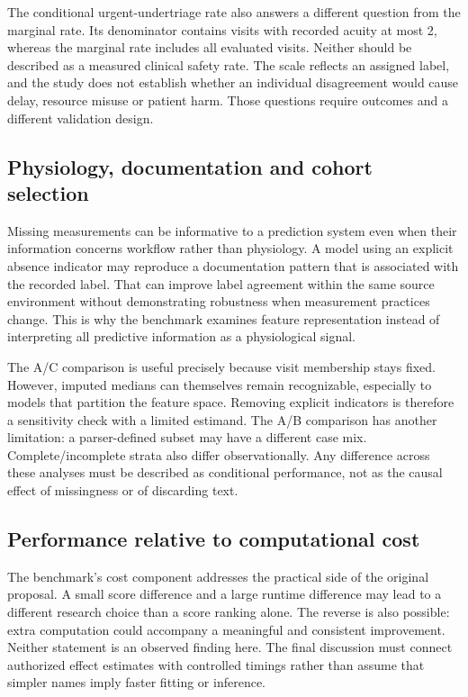 The conditional urgent-undertriage rate also answers a different question
from the marginal rate. Its denominator contains visits with recorded
acuity at most 2, whereas the marginal rate includes all evaluated visits.
Neither should be described as a measured clinical safety rate. The scale
reflects an assigned label, and the study does not establish whether an
individual disagreement would cause delay, resource misuse or patient harm.
Those questions require outcomes and a different validation design.

\subsection{Physiology, documentation and cohort selection}
Missing measurements can be informative to a prediction system even when
their information concerns workflow rather than physiology. A model using
an explicit absence indicator may reproduce a documentation pattern that
is associated with the recorded label. That can improve label agreement
within the same source environment without demonstrating robustness when
measurement practices change. This is why the benchmark examines feature
representation instead of interpreting all predictive information as a
physiological signal.

The A/C comparison is useful precisely because visit membership stays
fixed. However, imputed medians can themselves remain recognizable,
especially to models that partition the feature space. Removing explicit
indicators is therefore a sensitivity check with a limited estimand. The
A/B comparison has another limitation: a parser-defined subset may have a
different case mix. Complete/incomplete strata also differ observationally.
Any difference across these analyses must be described as conditional
performance, not as the causal effect of missingness or of discarding text.

\subsection{Performance relative to computational cost}
The benchmark's cost component addresses the practical side of the original
proposal. A small score difference and a large runtime difference may lead
to a different research choice than a score ranking alone. The reverse is
also possible: extra computation could accompany a meaningful and
consistent improvement. Neither statement is an observed finding here.
The final discussion must connect authorized effect estimates with
controlled timings rather than assume that simpler names imply faster
fitting or inference.

